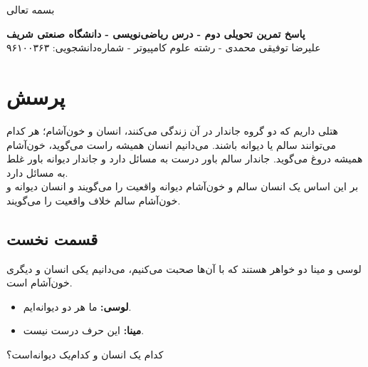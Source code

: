\documentclass[12pt,a4paper]{article}
\begin{document}
\begin{center}
	بسمه تعالی
\end{center}
\begin{center}
	\textbf{پاسخ تمرین تحویلی دوم - درس ریاضی‌نویسی - دانشگاه صنعتی شریف}
	\\
	علیرضا توفیقی محمدی - رشته علوم کامپیوتر - شماره‌دانشجویی: ۹۶۱۰۰۳۶۳
\end{center}
\section*{پرسش}
هتلی داریم که دو گروه جاندار در آن زندگی می‌کنند، انسان و خون‌آشام؛ هر کدام می‌توانند سالم یا دیوانه باشند.
می‌دانیم انسان همیشه راست می‌گوید، خون‌آشام همیشه دروغ می‌گوید. جاندار سالم باور درست به مسائل دارد و جاندار دیوانه باور غلط به مسائل دارد.
\\
بر این اساس یک انسان سالم و خون‌آشام دیوانه واقعیت را می‌گویند و انسان دیوانه و خون‌آشام سالم خلاف واقعیت را می‌گویند.
\subsection*{قسمت نخست}
لوسی و مینا دو خواهر هستند که با آن‌ها صحبت می‌کنیم، می‌دانیم یکی انسان و دیگری خون‌آشام است.
\begin{itemize}
	\item \textbf{لوسی:} ما هر دو دیوانه‌ایم.
	\item \textbf{مینا:} این حرف درست نیست.
\end{itemize}
کدام یک انسان و کدام‌یک دیوانه‌است؟
\end{document}
